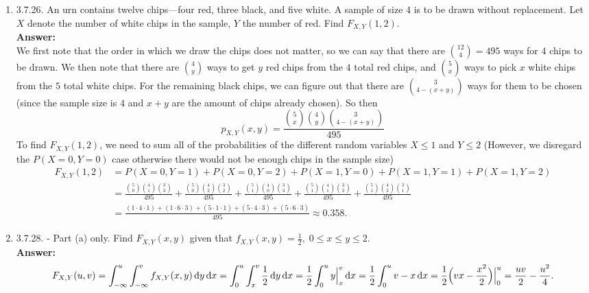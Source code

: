 \documentclass{article}
\begin{document}
\begin{enumerate}
        \item 3.7.26. An urn contains twelve chips---four red, three black, and five white. A sample of size $4$ is to be drawn without replacement. Let $X$ denote the number of white chips in the sample, $Y$ the number of red. Find $F_{X,Y}(1,2)$.\\
        \textbf{Answer: }\\
        We first note that the order in which we draw the chips does not matter, so we can say that there are ${12 \choose 4} = 495$ ways for $4$ chips to be drawn. We then note that there are ${4 \choose y}$ ways to get $y$ red chips from the $4$ total red chips, and ${5 \choose x}$ ways to pick $x$ white chips from the $5$ total white chips. For the remaining black chips, we can figure out that there are ${3 \choose 4-(x+y)}$ ways for them to be chosen (since the sample size is $4$ and $x+y$ are the amount of chips already chosen). So then 
            \[p_{X,Y}(x,y) = \frac{{5 \choose x}{4 \choose y}{3 \choose 4-(x+y)}}{495}\]
        To find $F_{X,Y}(1,2)$, we need to sum all of the probabilities of the different random variables $X \leq 1$ and $Y \leq 2$ (However, we disregard the $P(X = 0, Y = 0)$ case otherwise there would not be enough chips in the sample size)
            \begin{align*}
                F_{X,Y}(1,2) &= P(X=0,Y=1) + P(X=0,Y=2) + P(X=1,Y=0) + P(X=1,Y=1) + P(X=1,Y=2)\\
                &= \frac{{5 \choose 0}{4 \choose 1}{3 \choose 3}}{495} + \frac{{5 \choose 0}{4 \choose 2}{3 \choose 2}}{495} + \frac{{5 \choose 1}{4 \choose 0}{3 \choose 3}}{495} + \frac{{5 \choose 1}{4 \choose 1}{3 \choose 2}}{495} + \frac{{5 \choose 1}{4 \choose 2}{3 \choose 1}}{495}\\
                &= \frac{(1 \cdot 4 \cdot 1)+(1 \cdot 6 \cdot 3)+(5 \cdot 1 \cdot 1)+(5 \cdot 4 \cdot 3)+(5 \cdot 6 \cdot 3)}{495} \approx 0.358.
            \end{align*}
            
        \item 3.7.28. - Part (a) only. Find $F_{X,Y}(x,y)$ given that $f_{X,Y}(x,y) = \frac{1}{2}, \; 0 \leq x \leq y \leq 2$.\\
        \textbf{Answer: }\\
        \begin{align*}
            F_{X,Y}(u,v) = \int_{-\infty}^u \int_ {-\infty}^v f_{X,Y}(x,y) \dif y \dif x = \int_0^u \int_ x^v \frac{1}{2} \dif y \dif x = \frac{1}{2}\int_0^u y\Big|_x^v \dif x = \frac{1}{2}\int_0^u v-x \dif x = \frac{1}{2}\Big(vx-\frac{x^2}{2}\Big)\Big|_0^u = \frac{uv}{2}-\frac{u^2}{4}.
        \end{align*}
        

\end{enumerate}
\end{document}
